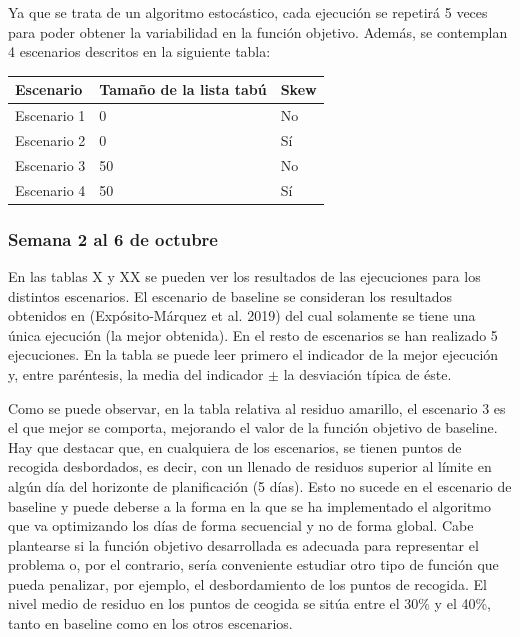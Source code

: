 \documentclass[
]{article}
\begin{document}
Ya que se trata de un algoritmo estocástico, cada ejecución se repetirá
5 veces para poder obtener la variabilidad en la función objetivo.
Además, se contemplan 4 escenarios descritos en la siguiente tabla:

\begin{longtable}[]{@{}lll@{}}
\toprule
Escenario & Tamaño de la lista tabú & Skew\tabularnewline
\midrule
\endhead
Escenario 1 & 0 & No\tabularnewline
Escenario 2 & 0 & Sí\tabularnewline
Escenario 3 & 50 & No\tabularnewline
Escenario 4 & 50 & Sí\tabularnewline
\bottomrule
\end{longtable}

\hypertarget{semana-2-al-6-de-octubre}{%
\subsubsection{Semana 2 al 6 de
octubre}\label{semana-2-al-6-de-octubre}}

En las tablas X y XX se pueden ver los resultados de las ejecuciones
para los distintos escenarios. El escenario de baseline se consideran
los resultados obtenidos en (Expósito-Márquez et al. 2019) del cual
solamente se tiene una única ejecución (la mejor obtenida). En el resto
de escenarios se han realizado 5 ejecuciones. En la tabla se puede leer
primero el indicador de la mejor ejecución y, entre paréntesis, la media
del indicador \(\pm\) la desviación típica de éste.

Como se puede observar, en la tabla relativa al residuo amarillo, el
escenario 3 es el que mejor se comporta, mejorando el valor de la
función objetivo de baseline. Hay que destacar que, en cualquiera de los
escenarios, se tienen puntos de recogida desbordados, es decir, con un
llenado de residuos superior al límite en algún día del horizonte de
planificación (5 días). Esto no sucede en el escenario de baseline y
puede deberse a la forma en la que se ha implementado el algoritmo que
va optimizando los días de forma secuencial y no de forma global. Cabe
plantearse si la función objetivo desarrollada es adecuada para
representar el problema o, por el contrario, sería conveniente estudiar
otro tipo de función que pueda penalizar, por ejemplo, el desbordamiento
de los puntos de recogida. El nivel medio de residuo en los puntos de
ceogida se sitúa entre el 30\% y el 40\%, tanto en baseline como en los
otros escenarios.
\end{document}
